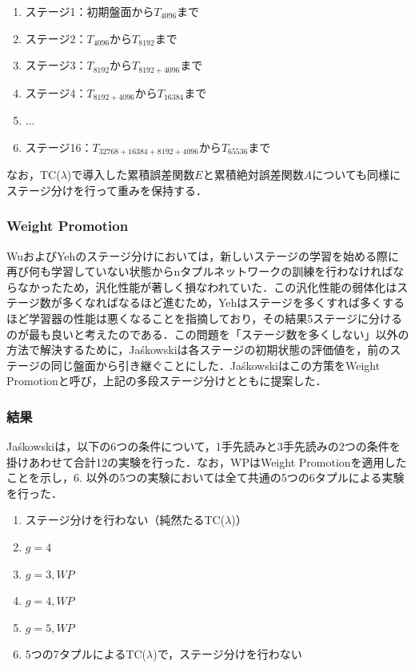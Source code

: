 \documentclass{suribt}
\begin{document}
\begin{enumerate}
\item ステージ1：初期盤面から$T_{4096}$まで
\item ステージ2：$T_{4096}$から$T_{8192}$まで
\item ステージ3：$T_{8192}$から$T_{8192+4096}$まで
\item ステージ4：$T_{8192+4096}$から$T_{16384}$まで
\item ...
\item ステージ16：$T_{32768+16384+8192+4096}$から$T_{65536}$まで
\end{enumerate}

なお，TC(${\lambda}$)で導入した累積誤差関数$E$と累積絶対誤差関数$A$についても同様にステージ分けを行って重みを保持する．

\subsubsection{Weight Promotion}
WuおよびYehのステージ分けにおいては，新しいステージの学習を始める際に再び何も学習していない状態からnタプルネットワークの訓練を行わなければならなかったため，汎化性能が著しく損なわれていた．この汎化性能の弱体化はステージ数が多くなればなるほど進むため，Yehはステージを多くすれば多くするほど学習器の性能は悪くなることを指摘しており，その結果5ステージに分けるのが最も良いと考えたのである．この問題を「ステージ数を多くしない」以外の方法で解決するために，Ja\'{s}kowskiは各ステージの初期状態の評価値を，前のステージの同じ盤面から引き継ぐことにした．Ja\'{s}kowskiはこの方策をWeight Promotionと呼び，上記の多段ステージ分けとともに提案した．

\subsubsection{結果}
Ja\'{s}kowskiは，以下の6つの条件について，1手先読みと3手先読みの2つの条件を掛けあわせて合計12の実験を行った．なお，WPはWeight Promotionを適用したことを示し，6. 以外の5つの実験においては全て共通の5つの6タプルによる実験を行った．

\begin{enumerate}
\item ステージ分けを行わない（純然たるTC(${\lambda}$)）
\item $g=4$
\item $g=3, WP$
\item $g=4, WP$
\item $g=5, WP$
\item 5つの7タプルによるTC(${\lambda}$)で，ステージ分けを行わない
\end{enumerate}
\end{document}
